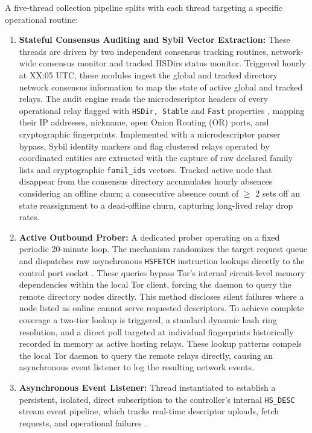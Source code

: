 \documentclass[conference]{IEEEtran}
\begin{document}
A five-thread collection pipeline splits with each thread targeting a specific operational routine:

\begin{enumerate}
    \item \textbf{Stateful Consensus Auditing and Sybil Vector Extraction:} These threads are driven by two independent consensus tracking routines, network-wide consensus monitor and tracked HSDirs status monitor. Triggered hourly at XX:05 UTC, these modules ingest the global and tracked directory network consensus information to map the state of active global and tracked relays. The audit engine reads the microdescriptor headers of every operational relay flagged with \texttt{HSDir, Stable} and \texttt{Fast} properties \cite{tor_dirspec}, mapping their IP addresses, nickname, open Onion Routing (OR) ports, and cryptographic fingerprints. Implemented with a microdescriptor parser bypass, Sybil identity markers and flag clustered relays operated by coordinated entities are extracted with the capture of raw declared family lists and cryptographic \texttt{famil\_ids} vectors. Tracked active node that disappear from the consensus directory accumulates hourly absences considering an offline churn; a consecutive absence count of $\geq$ 2 sets off an state reassignment to a dead-offline churn, capturing long-lived relay drop rates.
    \item \textbf{Active Outbound Prober:} A dedicated prober operating on a fixed periodic 20-minute loop. The mechanism randomizes the target request queue and dispatches raw asynchronous \texttt{HSFETCH} instruction lookups directly to the control port socket \cite{tor_controlspec}. These queries bypass Tor's internal circuit-level memory dependencies within the local Tor client, forcing the daemon to query the remote directory nodes directly. This method discloses silent failures where a node listed as online cannot serve requested descriptors. To achieve complete coverage a two-tier lookup is triggered, a standard dynamic hash ring resolution, and a direct poll targeted at individual fingerprints historically recorded in memory as active hosting relays. These lookup patterns compels the local Tor daemon to query the remote relays directly, causing an asynchronous event listener to log the resulting network events.
	\item \textbf{Asynchronous Event Listener:} Thread instantiated to establish a persistent, isolated, direct subscription to the controller's internal \texttt{HS\_DESC} stream event pipeline, which tracks real-time descriptor uploads, fetch requests, and operational failures \cite{tor_controlspec}.

\end{enumerate}
\end{document}
